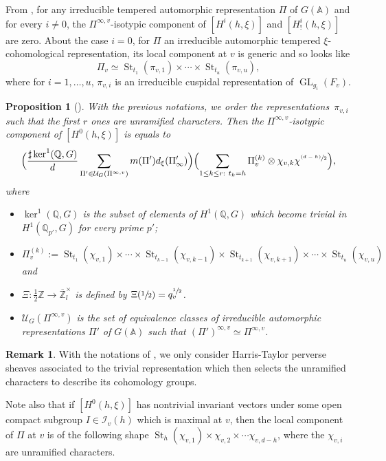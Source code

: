 \documentclass[JEP,XML,SOM,Unicode,published]{cedram}
\newcommand{\psfrac}[2]{\sfrac{(#1)}{#2}}
\DeclareMathOperator{\GL}{GL}
\theoremstyle{plain}
\newtheorem{prop}[equation]{Proposition}
\theoremstyle{definition}
\newtheorem*{remark}{Remark}
\numberwithin{equation}{subsection}
\newcommand\Am{{\mathbb A}}
\newcommand\Qm{{\mathbb Q}}
\newcommand\Zm{{\mathbb Z}}
\newcommand\IC{{\mathcal I}}
\newcommand\UC{{\mathcal U}}
\DeclareMathOperator{\st}{St}
\let \oo=\infty
\begin{document}
From \cite[Prop.\,3.6]{boyer-imj}, for any irreducible tempered automorphic representation
$\Pi$ of $G(\Am)$ and for every $i \neq 0$, the $\Pi^{\oo,v}$-isotypic component of
$[H^i(h,\xi)]$ and $[H^i_!(h,\xi)]$ are zero. About the case $i=0$, for $\Pi$ an irreducible
automorphic tempered $\xi$\nobreakdash-coho\-mo\-logical representation, its local component at $v$ is generic and so looks like
\[
\Pi_v \simeq \st_{t_1}(\pi_{v,1}) \times \cdots \times \st_{t_u}(\pi_{v,u}),
\]
where for $i=1,\dots,u$, $\pi_{v,i}$ is an irreducible cuspidal representation of $\GL_{g_i}(F_v)$.

\begin{prop}[{\cf \cite[Prop.\,3.9]{boyer-imj}}]\label{prop-temperee-explicite}
With the previous notations, we order the representations~$\pi_{v,i}$ such that the first $r$ ones are unramified
characters. Then the $\Pi^{\oo,v}$-isotypic component of $[H^0(h,\xi)]$ is equals to
\[
\Bigl (\frac{\sharp \ker^1(\Qm,G)}{d} \sum_{\Pi' \in \UC_G(\Pi^{\oo,v})}
m(\Pi') d_\xi(\Pi'_\oo) \Bigr) \Bigl (\sum_{1 \leq k \leq r:~ t_k=h} \Pi_v^{(k)} \otimes \chi_{v,k}
\chi^{\psfrac{d-h}{2}} \Bigr),
\]
where
\begin{itemize}
\item $ \ker^1(\Qm,G)$ is the subset of elements of $H^1(\Qm,G)$ which become trivial
in $H^1(\Qm_{p'},G)$ for every prime $p'$;

\item $\Pi_v^{(k)}:= \st_{t_1}(\chi_{v,1}) \times \cdots \times \st_{t_{k-1}}(\chi_{v,k-1}) \times
\st_{t_{k+1}}(\chi_{v,k+1}) \times \cdots \times \st_{t_u}(\chi_{v,u})$ and

\item $\Xi:\frac{1}{2} \Zm \to \overline \Zm_l^\times$
is defined by $\Xi(\sfrac{1}{2})=q_v^{\sfrac{1}{2}}$.

\item $\UC_G(\Pi^{\oo,v})$ is the set of equivalence classes of irreducible automorphic
representations $\Pi'$ of $G(\Am)$ such that $(\Pi')^{\oo,v} \simeq \Pi^{\oo,v}$.
\end{itemize}
\end{prop}

\begin{remark}
With the notations of \cite{boyer-imj}, we only consider Harris-Taylor perverse
sheaves associated to the trivial representation which then selects the unramified
characters to describe its cohomology groups.

Note also that if $[H^0(h,\xi)]$ has nontrivial invariant vectors under some open
compact subgroup $I \in \IC_v(h)$ which is maximal at $v$, then the local component
of $\Pi$ at $v$ is of the following shape $\st_h(\chi_{v,1}) \times \chi_{v,2} \times \cdots \chi_{v,d-h}$,
where the $\chi_{v,i}$ are unramified characters.
\end{remark}
\end{document}
